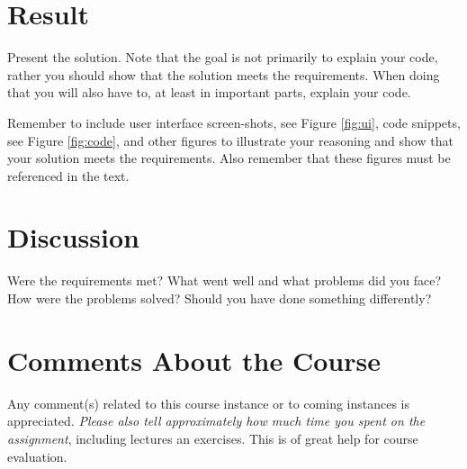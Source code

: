 \documentclass[a4paper]{scrartcl}
\begin{document}
\section{Result}

Present the solution. Note that the goal is not primarily to explain your code, rather you should show that the solution meets the requirements. When doing that you will also have to, at least in important parts, explain your code.

Remember to include user interface screen-shots, see Figure \ref{fig:ui}, code snippets, see Figure \ref{fig:code}, and other figures to illustrate your reasoning and show that your solution meets the requirements. Also remember that these figures must be referenced in the text.




\section{Discussion}

Were the requirements met? What went well and what problems did you face? How were the problems solved? Should you have done something differently?

\section{Comments About the Course}

Any comment(s) related to this course instance or to coming instances is appreciated. \textit{Please also tell approximately how much time you spent on the assignment}, including lectures an exercises. This is of great help for course evaluation.
\end{document}
